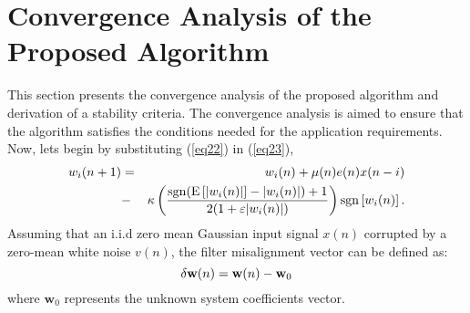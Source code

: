 \section{Convergence Analysis of the Proposed Algorithm}\label{sec:4.4}
\vspace{-0.5cm}
\noindent This section presents the convergence analysis of the proposed algorithm and derivation of a stability criteria. The convergence analysis is aimed to  ensure that the algorithm satisfies the conditions needed for the application requirements. Now, lets begin by substituting (\ref{eq22}) in (\ref{eq23}),
\vspace{-0.1cm}
\begin{eqnarray}
\nonumber
w_{i}(n+1)&=& w_{i}(n)+\mu(n)e(n)x(n-i)\\
&-& \kappa \left(\frac{\mathrm{sgn}(\mathrm{E}\left[|w_{i}(n)|\right]-|w_{i}(n)|) + 1}{2(1+\varepsilon|w_{i}(n)|)}\right) \mathrm{sgn}\left[w_{i}(n)\right]. \label{eq25}\vspace{-0.1cm}
\end{eqnarray}
\noindent Assuming that an i.i.d zero mean Gaussian input signal $x(n)$ corrupted by a zero-mean white noise $v(n)$, the filter misalignment vector can be defined as:
\vspace{-0.2cm}
\begin{equation}
\delta \textbf{w}(n)= \textbf{w}(n)-\textbf{w}_{0} \label{eq26}\vspace{-0.2cm}
\end{equation}
\noindent where $\textbf{w}_{0}$ represents the unknown system coefficients vector.

